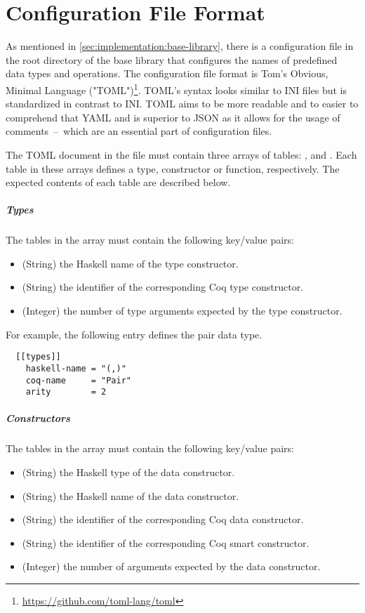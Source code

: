 \chapter{Configuration File Format} \label{appendix:config}
As mentioned in \autoref{sec:implementation:base-library}, there is a configuration file in the root directory of the base library that configures the names of predefined data types and operations.
The configuration file format is Tom's Obvious, Minimal Language ("TOML")\footnote{\url{https://github.com/toml-lang/toml}}.
TOML's syntax looks similar to INI files but is standardized in contrast to INI.
TOML aims to be more readable and to easier to comprehend that YAML and is superior to JSON as it allows for the usage of comments~--~which are an essential part of configuration files.

The TOML document in the  file must contain three arrays of tables: ,  and .
Each table in these arrays defines a type, constructor or function, respectively.
The expected contents of each table are described below.

\paragraph{Types}
The tables in the  array must contain the following key/value pairs:
\begin{itemize}
  \item {} (String) the Haskell name of the type constructor.
  \item {} (String) the identifier of the corresponding Coq type constructor.
  \item {} (Integer) the number of type arguments expected by the type constructor.
\end{itemize}

For example, the following entry defines the pair data type.
\begin{verbatim}
  [[types]]
    haskell-name = "(,)"
    coq-name     = "Pair"
    arity        = 2
\end{verbatim}

\paragraph{Constructors}
The tables in the  array must contain the following
key/value pairs:
\begin{itemize}
  \item {} (String) the Haskell type of the data constructor.
  \item {} (String) the Haskell name of the data constructor.
  \item {} (String) the identifier of the corresponding Coq data constructor.
  \item {} (String) the identifier of the corresponding Coq
    smart constructor.
  \item {} (Integer) the number of arguments expected by the data constructor.
\end{itemize}

